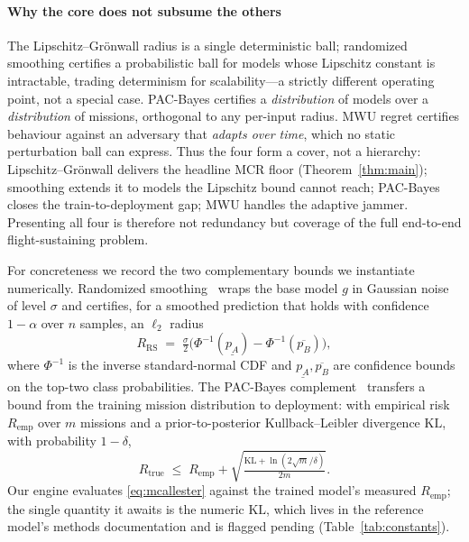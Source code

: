 \documentclass[conference]{IEEEtran}
\begin{document}
\paragraph{Why the core does not subsume the others}
The Lipschitz--Grönwall radius is a single deterministic ball; randomized
smoothing certifies a probabilistic ball for models whose Lipschitz constant is
intractable, trading determinism for scalability---a strictly different operating
point, not a special case. PAC-Bayes certifies a \emph{distribution} of models
over a \emph{distribution} of missions, orthogonal to any per-input radius. MWU
regret certifies behaviour against an adversary that \emph{adapts over time},
which no static perturbation ball can express. Thus the four form a cover, not a
hierarchy: Lipschitz--Grönwall delivers the headline MCR floor
(Theorem~\ref{thm:main}); smoothing extends it to models the Lipschitz bound
cannot reach; PAC-Bayes closes the train-to-deployment gap; MWU handles the
adaptive jammer. Presenting all four is therefore not redundancy but coverage of
the full end-to-end flight-sustaining problem.

For concreteness we record the two complementary bounds we instantiate
numerically. Randomized smoothing~\cite{cohen2019smoothing} wraps the base
model $g$ in Gaussian noise of level $\sigma$ and certifies, for a smoothed
prediction that holds with confidence $1-\alpha$ over $n$ samples, an
$\ell_2$ radius
\begin{equation}
\label{eq:cohen}
R_{\mathrm{RS}} \;=\; \tfrac{\sigma}{2}\big(\Phi^{-1}(\underline{p_A})-\Phi^{-1}(\overline{p_B})\big),
\end{equation}
where $\Phi^{-1}$ is the inverse standard-normal CDF and
$\underline{p_A},\overline{p_B}$ are confidence bounds on the top-two class
probabilities. The PAC-Bayes complement~\cite{mcallester1999pac,viallard2021pacbayes}
transfers a bound from the training mission distribution to deployment: with
empirical risk $R_{\mathrm{emp}}$ over $m$ missions and a
prior-to-posterior Kullback--Leibler divergence $\mathrm{KL}$, with probability
$1-\delta$,
\begin{equation}
\label{eq:mcallester}
R_{\mathrm{true}} \;\le\; R_{\mathrm{emp}} + \sqrt{\tfrac{\mathrm{KL}+\ln(2\sqrt{m}/\delta)}{2m}}.
\end{equation}
Our engine evaluates \eqref{eq:mcallester} against the trained model's measured
$R_{\mathrm{emp}}$; the single quantity it awaits is the numeric
$\mathrm{KL}$, which lives in the reference model's methods documentation and is
flagged pending (Table~\ref{tab:constants}).
\end{document}
